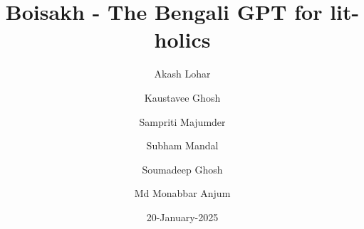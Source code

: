 \documentclass{article}
\title{Boisakh - The Bengali GPT for lit-holics}
\author{
    Akash Lohar \and
    Kaustavee Ghosh \and
    Sampriti Majumder \and
    Subham Mandal \and
    Soumadeep Ghosh \and
    Md Monabbar Anjum
}
\date{20-January-2025}
\begin{document}
\maketitle
\pagebreak
{}

\doublespace %
\tableofcontents
\singlespace %
\begin{appendix}
    \listoffigures
    \listoftables
\end{appendix}
\pagebreak


\end{document}
